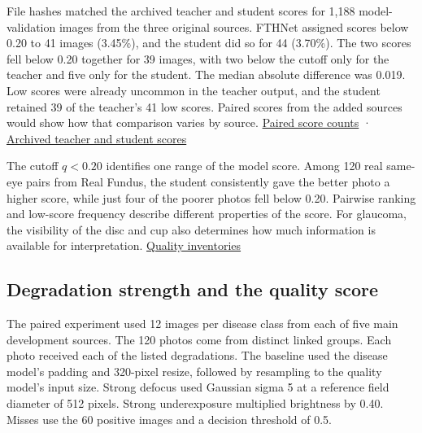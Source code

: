 \documentclass[
  10pt,
]{article}
\begin{document}
File hashes matched the archived teacher and student scores for 1,188
model-validation images from the three original sources. FTHNet assigned
scores below 0.20 to 41 images (3.45\%), and the student did so for 44
(3.70\%). The two scores fell below 0.20 together for 39 images, with
two below the cutoff only for the teacher and five only for the student.
The median absolute difference was 0.019. Low scores were already
uncommon in the teacher output, and the student retained 39 of the
teacher's 41 low scores. Paired scores from the added sources would show
how that comparison varies by source.
\href{completed-matched-defocus.json}{Paired score counts} ·
\href{../../../data/audit/session_20261110/selected_validation/quality_student/validation_predictions.csv}{Archived
teacher and student scores}

The cutoff \(q<0.20\) identifies one range of the model score. Among 120
real same-eye pairs from Real Fundus, the student consistently gave the
better photo a higher score, while just four of the poorer photos fell
below 0.20. Pairwise ranking and low-score frequency describe different
properties of the score. For glaucoma, the visibility of the disc and
cup also determines how much information is available for
interpretation. \href{quality-inventories.json}{Quality inventories}

\subsection{Degradation strength and the quality
score}\label{degradation-strength-and-the-quality-score}

The paired experiment used 12 images per disease class from each of five
main development sources. The 120 photos come from distinct linked
groups. Each photo received each of the listed degradations. The
baseline used the disease model's padding and 320-pixel resize, followed
by resampling to the quality model's input size. Strong defocus used
Gaussian sigma 5 at a reference field diameter of 512 pixels. Strong
underexposure multiplied brightness by 0.40. Misses use the 60 positive
images and a decision threshold of 0.5.
\end{document}
